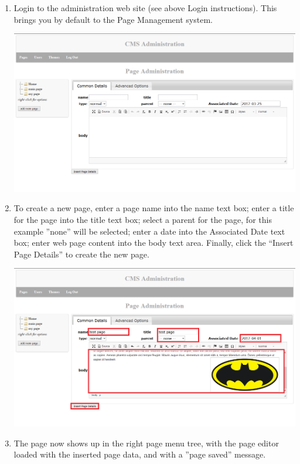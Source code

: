 \documentclass[12pt]{article}
\begin{document}
\begin{enumerate}
  \item Login to the administration web site (see above Login instructions). This brings you by default to the Page Management system.
  
  \includegraphics[width=\textwidth,height=\textheight,keepaspectratio]{pics/addPageThroughEditor_1.png}
  
  \item To create a new page, enter a page name into the name text box; enter a title for the page into the title text box; select a parent for the page, for this example ''none'' will be selected; enter a date into the Associated Date text box; enter web page content into the body text area. Finally, click the “Insert Page Details” to create the new page.
  
  \includegraphics[width=\textwidth,height=\textheight,keepaspectratio]{pics/addPageThroughEditor_2.png}
  
  \item The page now shows up in the right page menu tree, with the page editor loaded with the inserted page data, and with a ''page saved'' message.
  

\end{enumerate}
\end{document}

